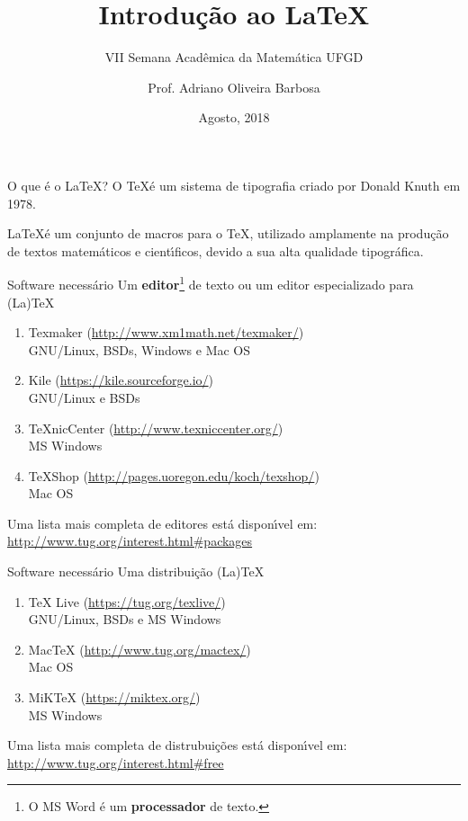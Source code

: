 \documentclass{beamer}
\author[Adriano Barbosa]{Prof. Adriano Oliveira Barbosa}
\title{Introdu\c{c}\~ao ao \LaTeX}
\subtitle[Semana da Matem\'atica]{VII Semana Acad\^emica da Matem\'atica UFGD}
\date{Agosto, 2018}
\begin{document}
\begin{frame}
	\maketitle
\end{frame}

\begin{frame}{O que \'e o \LaTeX?}
    O \TeX \'e um sistema de tipografia criado por Donald Knuth em 1978.

    \vspace{1cm}
    \pause

    \LaTeX \'e um conjunto de macros para o \TeX, utilizado amplamente na
    produ\c{c}\~ao de textos matem\'aticos e cient\'{\i}ficos, devido a sua alta qualidade
    tipogr\'afica.
\end{frame}

\begin{frame}[fragile]{Software necess\'ario}
    Um \textbf{editor}\footnote{O MS Word \'e um \textbf{processador} de texto.} de
    texto ou um editor especializado para (La)TeX
        \begin{enumerate}
            \item Texmaker (\url{http://www.xm1math.net/texmaker/}) \\ GNU/Linux, BSDs, Windows e Mac OS
            \item Kile (\url{https://kile.sourceforge.io/})\\ GNU/Linux e BSDs
            \item TeXnicCenter (\url{http://www.texniccenter.org/})\\ MS Windows
            \item TeXShop (\url{http://pages.uoregon.edu/koch/texshop/})\\ Mac OS
        \end{enumerate}

    \vspace{1cm}
    Uma lista mais completa de editores est\'a dispon\'{\i}vel em:
    \url{http://www.tug.org/interest.html#packages}
\end{frame}

\begin{frame}[fragile]{Software necess\'ario}
    Uma distribui\c{c}\~ao (La)TeX
        \begin{enumerate}
            \item TeX Live (\url{https://tug.org/texlive/})\\ GNU/Linux, BSDs e MS Windows
            \item MacTeX (\url{http://www.tug.org/mactex/})\\ Mac OS
            \item MiKTeX (\url{https://miktex.org/})\\ MS Windows
        \end{enumerate}

    \vspace{1cm}
    Uma lista mais completa de distrubui\c{c}\~oes est\'a dispon\'{\i}vel em:
    \url{http://www.tug.org/interest.html#free}
\end{frame}
\end{document}

